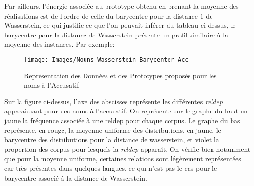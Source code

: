 \documentclass{article}
\begin{document}
\medskip
Par ailleurs, l'énergie associée au prototype obtenu en prenant la moyenne des réalisations est de l'ordre de celle du barycentre pour la distance-$1$ de Wasserstein, ce qui justifie ce que l'on pouvait inférer du tableau ci-dessus, le barycentre pour la distance de Wasserstein présente un profil similaire à la moyenne des instances.
Par exemple:

\begin{figure}[h]
\centering
\texttt{[image: Images/Nouns\_Wasserstein\_Barycenter\_Acc]}
\caption{Représentation des Données et des Prototypes proposés pour les noms à l'Accusatif}
\end{figure}

Sur la figure ci-dessus, l'axe des abscisses représente les différentes \textit{reldep} apparaissant pour des noms à l'accusatif.
On représente sur le graphe du haut en jaune la fréquence associée à une reldep pour chaque corpus.
Le graphe du bas représente, en rouge, la moyenne uniforme des distributions, en jaune, le barycentre des distributions pour la distance de wasserstein, et violet la proportion des corpus pour lesquels la \textit{reldep} apparaît.
On vérifie bien notamment que pour la moyenne uniforme, certaines relations sont légèrement représentées car très présentes dans quelques langues, ce qui n'est pas le cas pour le barycentre associé à la distance de Wasserstein.
\end{document}
